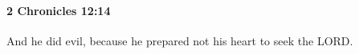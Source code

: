 
		\paragraph{2 Chronicles 12:14} %
			\label{2CHRONICLES-12-14}

			And he did evil, because he prepared not his heart to seek the LORD.


